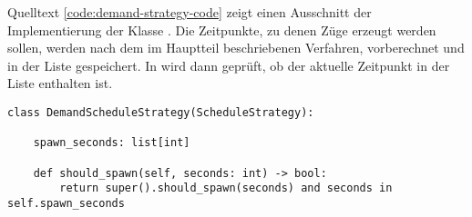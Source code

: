 Quelltext \ref{code:demand-strategy-code} zeigt einen Ausschnitt der Implementierung der Klasse . Die Zeitpunkte, zu denen Züge erzeugt werden sollen, werden nach dem im Hauptteil beschriebenen Verfahren, vorberechnet und in der Liste  gespeichert. In  wird dann geprüft, ob der aktuelle Zeitpunkt in der Liste enthalten ist.

\begin{lstlisting}[caption={Ausschnitt aus der Klasse \code{DemandScheduleStrategy} mit der Implementierung der Methode \code{should\_spawn}.}, label=code:demand-strategy-code]
class DemandScheduleStrategy(ScheduleStrategy):

    spawn_seconds: list[int]

    def should_spawn(self, seconds: int) -> bool:
        return super().should_spawn(seconds) and seconds in self.spawn_seconds

\end{lstlisting}

